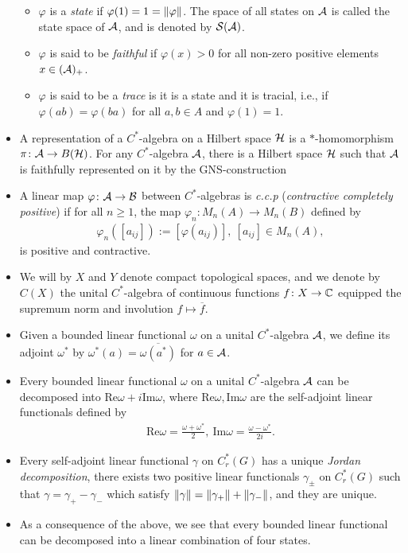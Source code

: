 \begin{itemize}
\begin{itemize}
\item $\varphi$ is a \emph{state} if $\varphi(1)=1=\lVert \varphi \rVert$. The space of all states on $\mathcal{A}$ is called the state space of $\mathcal{A}$, and is denoted by $\mathcal{S}(\mathcal{A})$.
\item $\varphi$ is said to be \emph{faithful} if $\varphi(x) > 0$ for all non-zero positive elements $x \in (\mathcal{A})_+$.
\item $\varphi$ is said to be a \emph{trace} is it is a state and it is tracial, i.e., if $\varphi(ab)=\varphi(ba)$ for all $a,b \in A$ and $\varphi(1)=1$.
\end{itemize}
\item A representation of a $C^*$-algebra on a Hilbert space $\mathcal{H}$ is a $*$-homomorphism $\pi \colon \mathcal{A} \to B(\mathcal{H})$. For any $C^*$-algebra $\mathcal{A}$, there is a Hilbert space $\mathcal{H}$ such that $\mathcal{A}$ is faithfully represented on it by the GNS-construction \cite[Thoerem 14.4][87]{zhu}
\item A linear map $\varphi \colon \mathcal{A} \to \mathcal{B}$ between $C^*$-algebras is \emph{c.c.p} (\textit{contractive completely positive}) if for all $n \geq 1$, the map $\varphi_n \colon M_n(A) \to M_n(B)$ defined by
\begin{align*}
\varphi_n([a_{ij}]):=[\varphi(a_{ij})], \ [a_{ij}] \in M_n(A),
\end{align*}
is positive and contractive.
\item We will by $X$ and $Y$ denote compact topological spaces, and we denote by $C(X)$ the unital $C^*$-algebra of continuous functions $f \colon X \to \mathbb{C}$ equipped the supremum norm and involution $f \mapsto \overline{f}$.
\item Given a bounded linear functional $\omega$ on a unital $C^*$-algebra $\mathcal{A}$, we define its adjoint $\omega^*$ by $\omega^*(a)=\overline{\omega(a^*)}$ for $a \in \mathcal{A}$.
\item Every bounded linear functional $\omega$ on a unital $C^*$-algebra $\mathcal{A}$ can be decomposed into $\mathrm{Re}\omega+i \mathrm{Im}\omega$, where $\mathrm{Re}\omega, \mathrm{Im}\omega$ are the self-adjoint linear functionals defined by
\begin{align*}
\mathrm{Re}\omega=\frac{\omega+\omega^*}{2}, \ \mathrm{Im}\omega = \frac{\omega-\omega^*}{2i}.
\end{align*}
\item Every self-adjoint linear functional $\gamma$ on $C_r^*(G)$ has a unique \emph{Jordan decomposition}, there exists two positive linear functionals $\gamma_{\pm}$ on $C_r^*(G)$ such that $\gamma=\gamma_+-\gamma_-$ which satisfy $\lVert \gamma \rVert = \lVert \gamma_+\rVert + \lVert \gamma_-\rVert$, and they are unique.
\item As a consequence of the above, we see that every bounded linear functional can be decomposed into a linear combination of four states.
\end{itemize}
